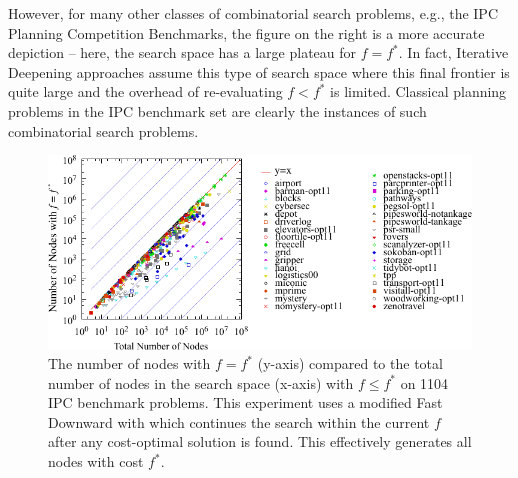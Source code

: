 However, for many other classes of combinatorial search problems, e.g., the IPC Planning Competition Benchmarks, 
the figure on the right is a more accurate depiction -- here, the  search space has a large plateau for $f=f^*$.
In fact, Iterative Deepening approaches \cite{korf1985depth} assume this type of search space
where this final frontier is quite large and the overhead of re-evaluating $f<f^*$ is limited.
Classical planning problems in the IPC benchmark set are clearly the instances of such combinatorial search problems.

\begin{figure}[htbp]
  \centering
  \includegraphics[width=\linewidth]{tables/aaai16-frontier/aaai16prelim3/lmcut_frontier_noh-front.pdf}
 \caption{
 The number of nodes with $f=f^*$ (y-axis) compared to the
 total number of nodes in the search space (x-axis) with $f\leq f^*$ on 1104 IPC benchmark problems.
 This experiment uses a modified Fast Downward with \lmcut which 
 continues the search within the current $f$ after any cost-optimal solution is found.
 This effectively generates all nodes with cost $f^*$.
  }
 \label{fig:plateau-noh}
\end{figure}

